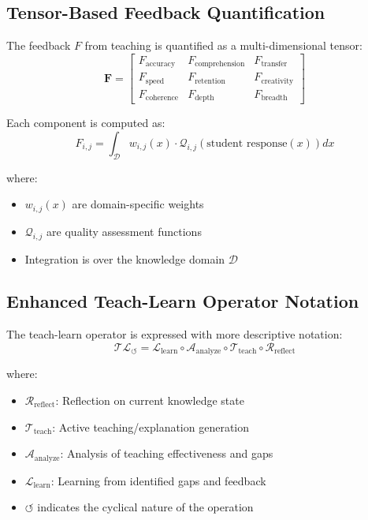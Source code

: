 \subsection{Tensor-Based Feedback Quantification}

The feedback $F$ from teaching is quantified as a multi-dimensional tensor:
\begin{equation}
\mathbf{F} = \begin{bmatrix}
F_{\text{accuracy}} & F_{\text{comprehension}} & F_{\text{transfer}} \\
F_{\text{speed}} & F_{\text{retention}} & F_{\text{creativity}} \\
F_{\text{coherence}} & F_{\text{depth}} & F_{\text{breadth}}
\end{bmatrix}
\end{equation}

Each component is computed as:
\begin{equation}
F_{i,j} = \int_{\mathcal{D}} w_{i,j}(x) \cdot \mathcal{Q}_{i,j}(\text{student response}(x)) dx
\end{equation}

where:
\begin{itemize}
    \item $w_{i,j}(x)$ are domain-specific weights
    \item $\mathcal{Q}_{i,j}$ are quality assessment functions
    \item Integration is over the knowledge domain $\mathcal{D}$
\end{itemize}

\subsection{Enhanced Teach-Learn Operator Notation}

The teach-learn operator is expressed with more descriptive notation:
\begin{equation}
\mathcal{T}\mathcal{L}_{\circlearrowleft} = \mathcal{L}_{\text{learn}} \circ \mathcal{A}_{\text{analyze}} \circ \mathcal{T}_{\text{teach}} \circ \mathcal{R}_{\text{reflect}}
\end{equation}

where:
\begin{itemize}
    \item $\mathcal{R}_{\text{reflect}}$: Reflection on current knowledge state
    \item $\mathcal{T}_{\text{teach}}$: Active teaching/explanation generation
    \item $\mathcal{A}_{\text{analyze}}$: Analysis of teaching effectiveness and gaps
    \item $\mathcal{L}_{\text{learn}}$: Learning from identified gaps and feedback
    \item $\circlearrowleft$ indicates the cyclical nature of the operation
\end{itemize}

